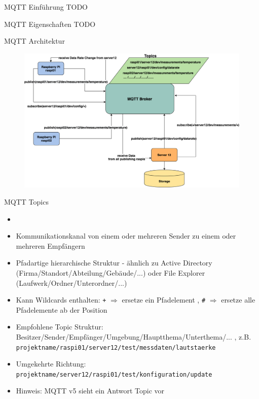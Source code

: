 \begin{frame}{MQTT Einführung}
    TODO
\end{frame}

\begin{frame}{MQTT Eigenschaften}
    TODO
\end{frame}


\begin{frame}{MQTT Architektur}
      \begin{figure}[!htb]
  \hspace*{5mm}
        \includegraphics[scale=0.15]{7-datenaustausch/img/mqttarch} 
    \end{figure}
\end{frame}


\begin{frame}{MQTT Topics}
     \begin{itemize}
        \setlength{\itemindent}{0.85in}
        \item [\textbf{MQTT Topics}]
    \end{itemize}
    \begin{itemize}
        \item Kommunikationskanal von einem oder mehreren Sender zu einem oder mehreren Empfängern
        \item Pfadartige hierarchische Struktur -  ähnlich zu Active Directory (Firma/Standort/Abteilung/Gebäude/...) oder File Explorer  (Laufwerk/Ordner/Unterordner/...) 
        \item Kann Wildcards enthalten:  \texttt{+} $\Rightarrow$ ersetze ein Pfadelement ,  \texttt{\#}  $\Rightarrow$ ersetze alle Pfadelemente ab der Position
        \item Empfohlene Topic Struktur:   Besitzer/Sender/Empfänger/Umgebung/Hauptthema/Unterthema/... , z.B.   \texttt{projektname/raspi01/server12/test/messdaten/lautstaerke}
        \item Umgekehrte Richtung:   \texttt{projektname/server12/raspi01/test/konfiguration/update}
        \item Hinweis: MQTT v5 sieht ein Antwort Topic vor
    \end{itemize}    
\end{frame}

